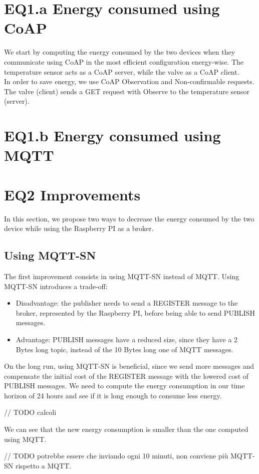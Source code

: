 \section{EQ1.a Energy consumed using CoAP}
We start by computing the energy consumed by the two devices when they communicate using CoAP in the most efficient configuration energy-wise. The temperature sensor acts as a CoAP server, while the valve as a CoAP client.\\
In order to save energy, we use CoAP Observation and Non-confirmable requests. The valve (client) sends a GET request with Observe to the temperature sensor (server). 

\section{EQ1.b Energy consumed using MQTT}

\section{EQ2 Improvements}
In this section, we propose two ways to decrease the energy consumed by the two device while using the Raspberry PI as a broker. 
\subsection{Using MQTT-SN}
The first improvement consists in using MQTT-SN instead of MQTT. Using MQTT-SN introduces a trade-off: 
\begin{itemize}
	\item Disadvantage: the publisher needs to send a REGISTER message to the broker, represented by the Raspberry PI, before being able to send PUBLISH messages.
	\item Advantage: PUBLISH messages have a reduced size, since they have a 2 Bytes long topic, instead of the 10 Bytes long one of MQTT messages.
\end{itemize}
On the long run, using MQTT-SN is beneficial, since we send more messages and compensate the initial cost of the REGISTER message with the lowered cost of PUBLISH messages. We need to compute the energy consumption in our time horizon of 24 hours and see if it is long enough to consume less energy.

// TODO calcoli

We can see that the new energy consumption is smaller than the one computed using MQTT.

// TODO potrebbe essere che inviando ogni 10 minuti, non conviene più MQTT-SN rispetto a MQTT.












